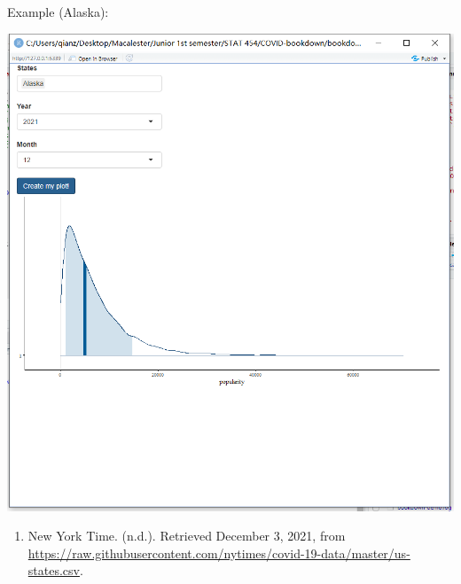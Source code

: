 \documentclass[
]{book}
\providecommand{\tightlist}{%
  \setlength{\itemsep}{0pt}\setlength{\parskip}{0pt}}
\begin{document}
Example (Alaska):

\includegraphics{baby_shinyapp.png}

\begin{enumerate}
\def\labelenumi{\arabic{enumi}.}
\tightlist
\item
  New York Time. (n.d.). Retrieved December 3, 2021, from \url{https://raw.githubusercontent.com/nytimes/covid-19-data/master/us-states.csv}.
\end{enumerate}

  
\end{document}
